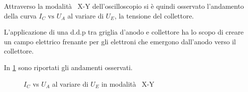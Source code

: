 	Attraverso la modalità  X-Y dell'oscilloscopio si è quindi
	osservato l'andamento della curva $I_C \text{ vs } U_A$ al
	variare di $U_E$, la tensione del collettore.

	L'applicazione di una d.d.p tra griglia d'anodo e collettore ha lo scopo di creare un campo elettrico frenante per gli elettroni che emergono dall'anodo verso il collettore.

	In \figurename{ \ref{fig:ue}} sono riportati gli andamenti osservati.

\begin{figure}[h!]
		\centering
		\caption{$I_C$ vs $U_A$ al variare di $U_E$ in modalità  X-Y}
	\label{fig:ue}
\end{figure}
